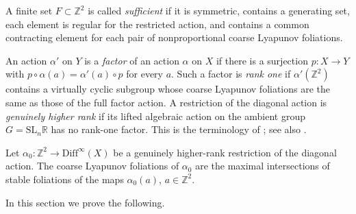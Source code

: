 \documentclass[11pt]{amsart}
\numberwithin{equation}{section}
\newcommand{\R}{\mathbb{R}}
\newcommand{\Z}{\mathbb{Z}}
\newcommand{\Diff}{\mathrm{Diff}}
\theoremstyle{plain}
\begin{document}
A finite set $F\subset\mathbb Z^2$ is called \emph{sufficient} if it is
symmetric, contains a generating set, each element is regular for the restricted action, and contains a common contracting element
for each pair of nonproportional coarse Lyapunov foliations.

An action $\alpha'$ on $Y$ is a \emph{factor} of an action $\alpha$ on
$X$ if there is a surjection $p:X\to Y$ with
$p\circ\alpha(a)=\alpha'(a)\circ p$ for every $a$.  Such a factor is
\emph{rank one} if $\alpha'(\mathbb Z^2)$ contains a virtually cyclic
subgroup whose coarse Lyapunov foliations are the same as those of the
full factor action.  A restriction of the diagonal action is
\emph{genuinely higher rank} if its lifted algebraic action on the ambient
group $G=\mathrm{SL}_n\R$ has no rank-one factor.  This is the terminology of
\cite[Definition~3.2 and Section~3.2]{VinWang}; see also
\cite[Section~5]{Wang26}.


Let
$
\alpha_0:\mathbb Z^2\longrightarrow\Diff^\infty(X)
$
be a genuinely higher-rank restriction of the diagonal action.
The coarse Lyapunov foliations of $\alpha_0$ are the
maximal intersections of stable foliations of
the maps $\alpha_0(a)$, $a\in \Z^2$.


In this section we prove the following.
\end{document}
